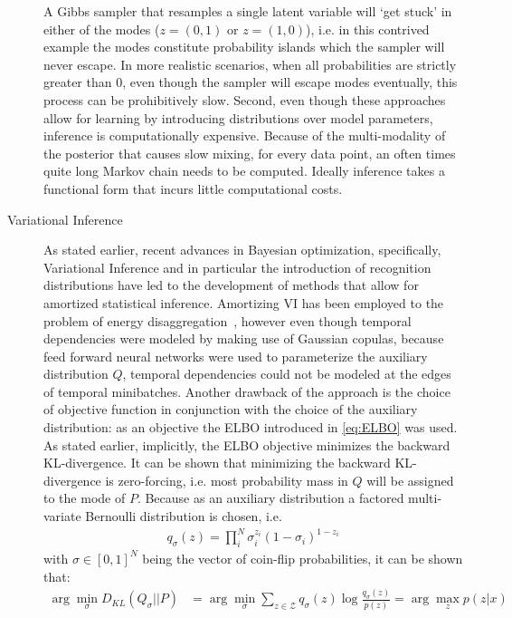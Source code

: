\documentclass[11pt]{cmuthesis} %
\begin{document}
\begin{description}
A Gibbs sampler that resamples a single latent variable will `get stuck' in either of the modes ($z = (0,1)$ or $z = (1,0)$), i.e. in this contrived example the modes constitute probability islands which the sampler will never escape. In more realistic scenarios, when all probabilities are strictly greater than 0, even though the sampler will escape modes eventually, this process can be prohibitively slow. Second, even though these approaches allow for learning by introducing distributions over model parameters, inference is computationally expensive. Because of the multi-modality of the posterior that causes slow mixing, for every data point, an often times quite long Markov chain needs to be computed. Ideally inference takes a functional form that incurs little computational costs.
\iffalse
\item[Variational Inference] As stated earlier, recent advances in Bayesian optimization, specifically, Variational Inference and in particular the introduction of recognition distributions have led to the development of methods that allow for amortized statistical inference. 
Amortizing VI has been employed to the problem of energy disaggregation~\cite{ng2016scaling}, however even though temporal dependencies were modeled by making use of Gaussian copulas, because feed forward neural networks were used to parameterize the auxiliary distribution $Q$, temporal dependencies could not be modeled at the edges of temporal minibatches. Another drawback of the approach is the choice of objective function in conjunction with the choice of the auxiliary distribution: as an objective the ELBO introduced in \eqref{eq:ELBO} was used. As stated earlier, implicitly, the ELBO objective minimizes the backward KL-divergence. It can be shown that minimizing the backward KL-divergence is zero-forcing, i.e. most probability mass in $Q$ will be assigned to the mode of $P$. Because as an auxiliary distribution a factored multi-variate Bernoulli distribution is chosen, i.e.
\begin{align*}
 q_\sigma(z) = \prod_i^N \sigma_i^{z_i}(1-\sigma_i)^{1-z_i}
\end{align*}
with $\sigma \in [0,1]^N$ being the vector of coin-flip probabilities, it can be shown that:
\begin{align*}
 \arg \min_{\sigma} D_{KL}(Q_\sigma||P) &= \arg \min_{\sigma} \sum_{z \in \mathcal{Z}} q_\sigma(z)\log \frac{q_\sigma(z)}{p(z)} = \arg \max_z p(z|x)
\end{align*}

\end{description}
\end{document}
